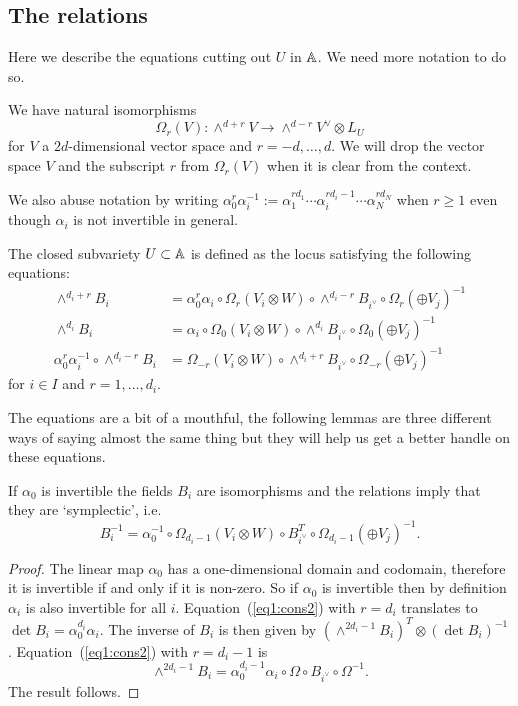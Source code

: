 \documentclass{amsart}
\theoremstyle{definition}
\begin{document}
\subsection{The relations}
Here we describe the equations cutting out $U$ in $\mathbb{A}$.
We need more notation to do so.

\begin{notation}
We have natural isomorphisms
$$\Omega_r(V) \colon \wedge^{d+r} V \rightarrow \wedge^{d-r} V^\vee \otimes L_U$$ for $V$ a $2d$-dimensional vector space and $r= -d, \ldots, d$.
We will drop the vector space $V$ and the subscript $r$ from $\Omega_r(V)$ when it is clear from the context.

We also abuse notation by writing $\alpha_0^r \alpha_i^{-1} := \alpha_1^{rd_1} \cdots \alpha_i^{rd_i-1} \cdots \alpha_N^{rd_N}$ when $r\geq 1$ even though $\alpha_i$ is not invertible in general.
\end{notation}

\begin{definition}\label{def:equa}
The closed subvariety $U \subset \mathbb{A}$ is defined as the locus satisfying the following equations:
\begin{align}
    \wedge^{d_i+r} B_i &= \alpha_0^r \alpha_i \circ \Omega_r(V_i \otimes W) \circ \wedge^{d_i-r} B_{i^\vee} \circ \Omega_r(\oplus V_j)^{-1}  \label{eq1:cons2} \\
    \wedge^{d_i} B_i &= \alpha_i \circ \Omega_{0}(V_i \otimes W) \circ \wedge^{d_i} B_{i^\vee} \circ \Omega_{0}(\oplus V_j)^{-1} \label{eq2:cons2} \\
    \alpha_0^r \alpha_i^{-1} \circ \wedge^{d_i-r} B_i &= \Omega_{-r}(V_i \otimes W) \circ \wedge^{d_i+r} B_{i^\vee} \circ \Omega_{-r}(\oplus V_j)^{-1} \label{eq3:cons2} 
\end{align}
for $i\in I$ and $r=1,\ldots,d_i$.
\end{definition}

The equations are a bit of a mouthful, the following lemmas are three different ways of saying almost the same thing but they will help us get a better handle on these equations.

\begin{lemma}\label{lem:symp1}
If $\alpha_0$ is invertible the fields $B_i$ are isomorphisms and the relations imply that they are `symplectic', i.e.
$$B_i^{-1} = \alpha_0^{-1} \circ \Omega_{d_i-1}(V_i \otimes W) \circ B_{i^\vee}^T \circ \Omega_{d_i-1}(\oplus V_j)^{-1}.$$
\end{lemma}

\begin{proof}
The linear map $\alpha_0$ has a one-dimensional domain and codomain, therefore it is invertible if and only if it is non-zero.
So if $\alpha_0$ is invertible then by definition $\alpha_i$ is also invertible for all $i$.
Equation~(\ref{eq1:cons2}) with $r=d_i$ translates to $\det B_i= \alpha_0^{d_i} \alpha_i$.
The inverse of $B_i$ is then given by $(\wedge^{2d_i-1}B_i)^T \otimes (\det B_i)^{-1}$.
Equation~(\ref{eq1:cons2}) with $r=d_i-1$ is $$\wedge^{2d_i-1} B_i = \alpha_0^{d_i-1} \alpha_i \circ \Omega \circ B_{i^\vee} \circ \Omega^{-1}.$$
The result follows.
\end{proof}
\end{document}
